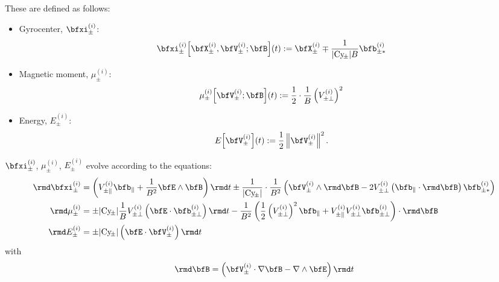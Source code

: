     \begin{definition}
        These are defined as follows:
        \begin{itemize}
            \item  Gyrocenter, $\bfxi_{\pm}^{(i)}$:
            \begin{equation}
                \bfxi_{\pm}^{(i)}\!\left[\bfX_{\pm}^{(i)}, \bfV_{\pm}^{(i)}; \bfB\right]\!(t)  :=  \bfX_{\pm}^{(i)} \mp \frac{1}{|\rmCy\!_{\pm}|B}\bfb_{\pm*}^{(i)}
            \end{equation}
            \item  Magnetic moment, $\mu_{\pm}^{(i)}$:
            \begin{equation}
                \mu_{\pm}^{(i)}\!\left[\bfV_{\pm}^{(i)}; \bfB\right]\!(t)  :=  \frac{1}{2}\cdot\frac{1}{B}\left(V_{\pm\perp}^{(i)}\right)^{2}
            \end{equation}
            \item  Energy, $E_{\pm}^{(i)}$:
            \begin{equation}
                E\!\left[\bfV_{\pm}^{(i)}\right]\!(t)  :=  \frac{1}{2}\left\|\bfV_{\pm}^{(i)}\right\|^{2}.
            \end{equation}
        \end{itemize}
    \end{definition}

    $\bfxi_{\pm}^{(i)}$, $\mu_{\pm}^{(i)}$, $E_{\pm}^{(i)}$ evolve according to the equations:
    \begin{align}
        \rmd\bfxi_{\pm}^{(i)} 
            &=  \left(V_{\pm\parallel}^{(i)}\bfb_{\parallel} + \frac{1}{B^{2}}\bfE\wedge\bfB\right)\rmd t
            \pm \frac{1}{|\rmCy\!_{\pm}|}\cdot\frac{1}{B^{2}}\left(\bfV_{\pm}^{(i)}\wedge\rmd\bfB - 2V_{\pm\perp}^{(i)}\left(\bfb_{\parallel}\cdot\rmd\bfB\right)\bfb_{\pm*}^{(i)}\right)  \label{eqn:gyrocenter equation}  \\
        \rmd\mu_{\pm}^{(i)}
            &=  \pm |\rmCy\!_{\pm}|\frac{1}{B}V_{\pm\perp}^{(i)}\left(\bfE\cdot\bfb_{\pm\perp}^{(i)}\right)\rmd t
            - \frac{1}{B^{2}}\left(\frac{1}{2}\left(V_{\pm\perp}^{(i)}\right)^{2}\bfb_{\parallel} + V_{\pm\parallel}^{(i)}V_{\pm\perp}^{(i)}\bfb_{\pm\perp}^{(i)}\right)\cdot\rmd\bfB  \label{eqn:magnetic moment equation}  \\
        \rmd E_{\pm}^{(i)}
            &=  \pm|\rmCy\!_{\pm}|\left(\bfE\cdot\bfV_{\pm}^{(i)}\right)\rmd t
    \end{align}
    with
    \begin{equation}
        \rmd\bfB  =  \left(\bfV_{\pm}^{(i)}\cdot\nabla\bfB - \nabla\wedge\bfE\right)\rmd t
    \end{equation}


